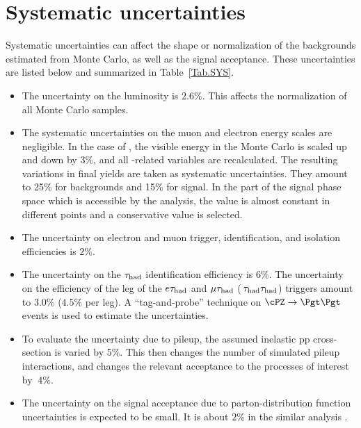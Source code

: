 \section{Systematic uncertainties}
\label{sect:sys}
Systematic uncertainties can affect the shape or normalization of the
backgrounds estimated from Monte Carlo, as well as the signal acceptance.
These uncertainties are listed below and summarized in Table~\ref{Tab.SYS}.


\begin{itemize}

\item The uncertainty on the luminosity  is $2.6\%$.  This affects the
  normalization of all Monte Carlo samples.
 
\item  The systematic uncertainties on the muon and electron energy scales
  are negligible.  In the case of \Tau, the visible energy in the Monte Carlo
  is scaled up and down by $3\%$, and all \Tau-related variables are
  recalculated.  The resulting variations in final yields are taken as
  systematic
  uncertainties.  They amount to 25\% for backgrounds and 15\% for signal.
  In the part of the signal phase space which is accessible by the analysis,
  the value is almost constant in different points and a conservative value is selected.

\item The uncertainty on electron and muon trigger, identification, and
  isolation efficiencies is $2\%$.

\item The uncertainty on the $\tau_{\rm had}$ identification efficiency is $6\%$. 
  The uncertainty on the efficiency of the \Tau leg of the $e\tau_{\rm had}$ and
  $\mu\tau_{\rm had}$ ($\,\tau_{\rm had}\tau_{\rm had}$) triggers amount to $3.0\%$ ($4.5\%$ per leg).
  A ``tag-and-probe'' technique on $\cPZ\to \Pgt\Pgt$ events is used to estimate the 
  uncertainties.

\item To evaluate the uncertainty due to pileup, the assumed inelastic
  pp cross-section is varied by 5\%.  This then changes the number
  of simulated pileup interactions, and changes the relevant acceptance
  to the processes of interest by $~4 \%$.

\item The uncertainty on the signal acceptance due to parton-distribution
  function uncertainties is expected to be small.
  It is about $2\%$ in the similar analysis \cite{Khachatryan:2014qwa}.


\end{itemize}
